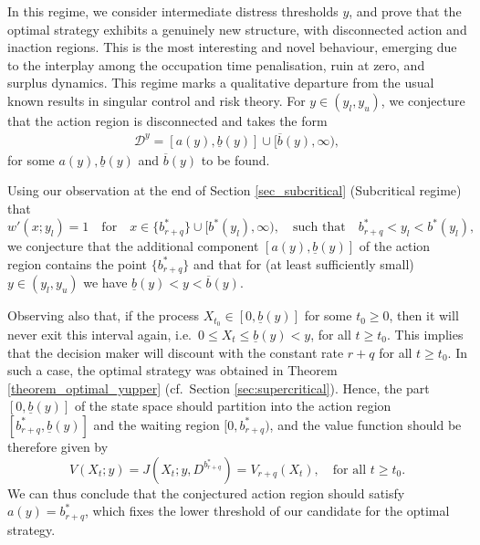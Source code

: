 \documentclass[11pt]{article} %
\numberwithin{komcounter}{section}
\numberwithin{equation}{section}
\numberwithin{theorem}{section}
\begin{document}
In this regime, we consider intermediate distress thresholds $y$, and prove that the optimal strategy exhibits a genuinely new structure, with disconnected action and inaction regions. 
This is the most interesting and novel behaviour, emerging due to the interplay among the occupation time penalisation, ruin at zero, and surplus dynamics. This regime marks a qualitative departure from the usual known results in singular control and risk theory.
For $y \in (y_l, y_u)$, we conjecture that the action region is disconnected and takes the form 
\begin{align*}
\mathcal{D}^{y} = [a(y),\underline{b}(y)] \cup [\overline{b}(y), \infty),
\end{align*}
for some $a(y), \underline{b}(y)$ and $\overline{b}(y)$ to be found. 

Using our observation at the end of Section \ref{sec_subcritical} (Subcritical regime) that  
$$
w'(x;y_l) = 1 
\quad \text{for} \quad 
x \in \{b^*_{r+q}\} \cup [b^*(y_l), \infty), 
\quad \text{such that} \quad 
b^*_{r+q} < y_l < b^*(y_l), 
$$ 
we conjecture that the additional component $[a(y), \underline{b}(y)]$ of the action region contains the point $\{b^*_{r+q}\}$ and that for (at least sufficiently small) $y \in (y_l,y_u)$ we have  $\underline{b}(y) < y < \overline{b}(y)$.

Observing also that, if the process $X_{t_0} \in [0, \underline{b}(y)]$ for some $t_0 \geq 0$, then it will never exit this interval again, i.e.~$0 \leq X_t \leq \underline{b}(y) < y$, for all $t \geq t_0$. 
This implies that the decision maker will discount with the constant rate $r+q$ for all $t \geq t_0$. 
In such a case, the optimal strategy was obtained in Theorem \ref{theorem_optimal_yupper} (cf.~Section \ref{sec:supercritical}). 
Hence, the part $[0, \underline{b}(y)]$ of the state space should partition into the action region $[b^*_{r+q}, \underline{b}(y)]$ and the waiting region $[0, b^*_{r+q})$, and the value function should be therefore given by  
$$
V(X_t;y) = J(X_t;y,D^{b^*_{r+q}})=V_{r+q}(X_t), \quad \text{for all } t \geq t_0.
$$ 
We can thus conclude that the conjectured action region should satisfy $a(y) = b^*_{r+q}$, which fixes the lower threshold of our candidate for the optimal strategy. 
\end{document}

